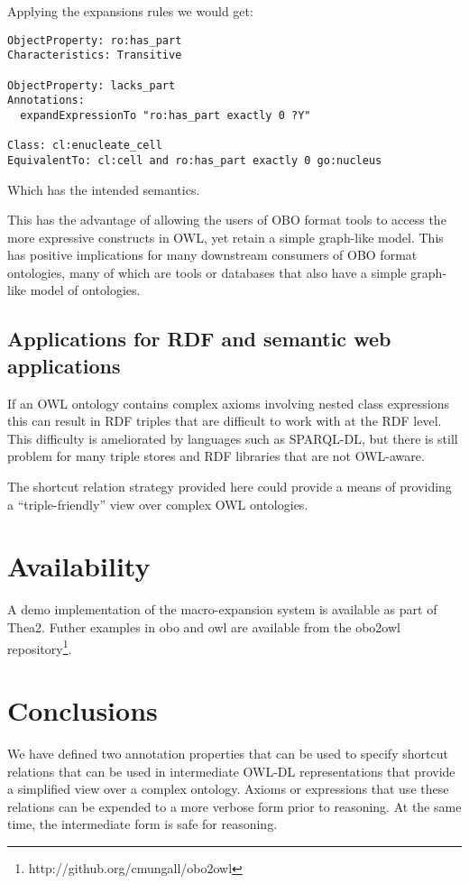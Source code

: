 \documentclass{llncs}
\begin{document}
Applying the expansions rules we would get:

\begin{verbatim}
ObjectProperty: ro:has_part
Characteristics: Transitive

ObjectProperty: lacks_part
Annotations:
  expandExpressionTo "ro:has_part exactly 0 ?Y"

Class: cl:enucleate_cell
EquivalentTo: cl:cell and ro:has_part exactly 0 go:nucleus
\end{verbatim}

Which has the intended semantics.

This has the advantage of allowing the users of OBO format tools to
access the more expressive constructs in OWL, yet retain a simple
graph-like model. This has positive implications for many downstream
consumers of OBO format ontologies, many of which are tools or
databases that also have a simple graph-like model of ontologies.

\subsection{Applications for RDF and semantic web applications}

If an OWL ontology contains complex axioms involving nested class
expressions this can result in RDF triples that are difficult to work
with at the RDF level. This difficulty is ameliorated by languages
such as SPARQL-DL, but there is still problem for many triple stores
and RDF libraries that are not OWL-aware.

The shortcut relation strategy provided here could provide a means of
providing a ``triple-friendly'' view over complex OWL ontologies.

\section{Availability}

A demo implementation of the macro-expansion system is available as
part of Thea2\cite{Vangelis_2009}. Futher examples in obo and owl are
available from the obo2owl
repository\footnote{http://github.org/cmungall/obo2owl}.

\section{Conclusions}

We have defined two annotation properties that can be used to specify
shortcut relations that can be used in intermediate OWL-DL
representations that provide a simplified view over a complex
ontology. Axioms or expressions that use these relations can be
expended to a more verbose form prior to reasoning. At the same time,
the intermediate form is safe for reasoning.
\end{document}
